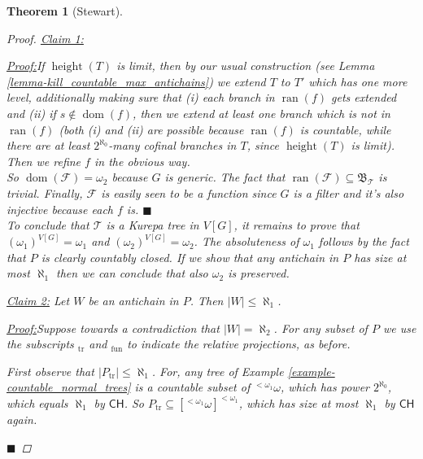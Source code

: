 \documentclass[11pt,a4paper]{report}
\newtheorem{theorem}{Theorem}[chapter] %
\theoremstyle{definition}
\theoremstyle{num.custom-title}
\theoremstyle{custom-title}
\newenvironment{claim}[1]{\par\noindent\underline{Claim#1:}\space}{} %
\newenvironment{claimproof}[1]{\par\noindent\underline{Proof:}\space#1}{\leavevmode\unskip\penalty9999 \hbox{}\nobreak\hfill\quad\hbox{$\blacksquare$}} %
\DeclareMathOperator{\dom}{dom}
\DeclareMathOperator{\ran}{ran}
\DeclareMathOperator{\sse}{\subseteq}
\DeclareMathOperator{\height}{height}
\newcommand{\CH}{\ensuremath{\mathsf{CH}}\xspace}
\newcommand{\F}{\mathcal{F}}
\newcommand{\T}{\mathcal{T}}
\begin{document}
\begin{theorem}[Stewart]
\begin{proof}
\begin{claim}{ 1}
\begin{claimproof}
If $\height(T)$ is limit, then by our usual construction (see Lemma \ref{lemma-kill_countable_max_antichains}) we extend $T$ to $T'$ which has one more level, additionally making sure that (i) each branch in $\ran(f)$ gets extended and (ii) if $s \not\in \dom(f)$, then we extend at least one branch which is not in $\ran(f)$ (both (i) and (ii) are possible because $\ran(f)$ is countable, while there are at least $2^{\aleph_0}$-many cofinal branches in $T$, since $\height(T)$ is limit). Then we refine $f$ in the obvious way.\\
So $\dom(\F) = \omega_2$ because $G$ is generic. The fact that $\ran(\F) \sse \mathfrak{B}_{\T}$ is trivial. Finally, $\F$ is easily seen to be a function since $G$ is a filter and it's also injective because each $f$ is.
\end{claimproof}
\end{claim}
\\[6pt]
\indent To conclude that $\T$ is a Kurepa tree in $V[G]$, it remains to prove that $(\omega_1)^{V[G]} = \omega_1$ and $(\omega_2)^{V[G]} = \omega_2$. The absoluteness of $\omega_1$ follows by the fact that $P$ is clearly countably closed. If we show that any antichain in $P$ has size at most $\aleph_1$ then we can conclude that also $\omega_2$ is preserved.\\[-10pt]
\begin{claim}{ 2}
Let $W$ be an antichain in $P$. Then $|W| \leq \aleph_1$.
\begin{claimproof}
Suppose towards a contradiction that $|W| = \aleph_2$. For any subset of $P$ we use the subscripts $_{\text{tr}}$ and $_{\text{fun}}$ to indicate the relative projections, as before.

First observe that $|P_{\text{tr}}| \leq \aleph_1$. For, any tree of Example \ref{example-countable_normal_trees} is a countable subset of $^{< \omega_1} \omega$, which has power $2^{\aleph_0}$, which equals $\aleph_1$ by \CH. So $P_{\text{tr}} \sse [{^{< \omega_1}} \omega]^{<\omega_1}$, which has size at most $\aleph_1$ by \CH again.


\end{claimproof}
\end{claim}
\end{proof}
\end{theorem}
\end{document}
